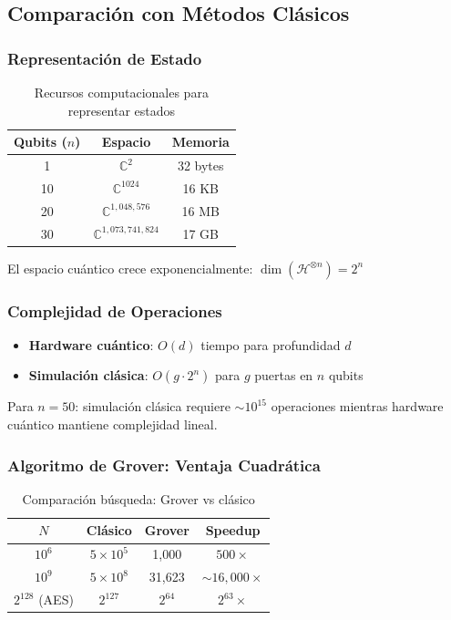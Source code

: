 \documentclass[12pt]{article}
\begin{document}
\subsection{Comparación con Métodos Clásicos}

\subsubsection{Representación de Estado}

\begin{table}[H]
\centering
\caption{Recursos computacionales para representar estados}
\label{tab:recursos_estado}
\begin{tabular}{|c|c|c|}
\hline
\textbf{Qubits ($n$)} & \textbf{Espacio} & \textbf{Memoria} \\
\hline
1 & $\mathbb{C}^2$ & 32 bytes \\
10 & $\mathbb{C}^{1024}$ & 16 KB \\
20 & $\mathbb{C}^{1,048,576}$ & 16 MB \\
30 & $\mathbb{C}^{1,073,741,824}$ & 17 GB \\
\hline
\end{tabular}
\end{table}

El espacio cuántico crece exponencialmente: $\dim(\mathcal{H}^{\otimes n}) = 2^n$

\subsubsection{Complejidad de Operaciones}

\begin{itemize}
    \item \textbf{Hardware cuántico}: $O(d)$ tiempo para profundidad $d$
    \item \textbf{Simulación clásica}: $O(g \cdot 2^n)$ para $g$ puertas en $n$ qubits
\end{itemize}

Para $n=50$: simulación clásica requiere $\sim 10^{15}$ operaciones mientras hardware cuántico mantiene complejidad lineal.

\subsubsection{Algoritmo de Grover: Ventaja Cuadrática}

\begin{table}[H]
\centering
\caption{Comparación búsqueda: Grover vs clásico}
\label{tab:grover_vs_clasico}
\begin{tabular}{|c|c|c|c|}
\hline
\textbf{$N$} & \textbf{Clásico} & \textbf{Grover} & \textbf{Speedup} \\
\hline
$10^6$ & $5 \times 10^5$ & 1,000 & $500\times$ \\
$10^9$ & $5 \times 10^8$ & 31,623 & $\sim 16,000\times$ \\
$2^{128}$ (AES) & $2^{127}$ & $2^{64}$ & $2^{63}\times$ \\
\hline
\end{tabular}
\end{table}
\end{document}
